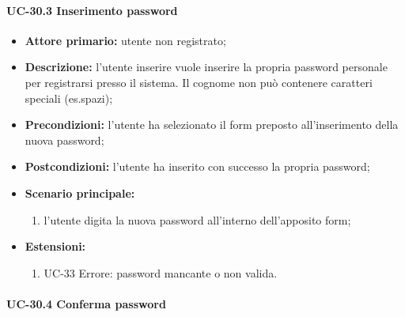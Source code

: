 \paragraph{UC-30.3 Inserimento password}

	\begin{itemize}
		\item \textbf{Attore primario:} utente non registrato;

		\item \textbf{Descrizione:} l'utente inserire vuole inserire la propria password personale per registrarsi presso il sistema. Il cognome non può contenere caratteri speciali (es.spazi);

		\item \textbf{Precondizioni:} l'utente ha selezionato il form preposto all'inserimento della nuova password;

		\item \textbf{Postcondizioni:} l'utente ha inserito con successo la propria password;

		\item \textbf{Scenario principale:}
			\begin{enumerate}
		  		\item l'utente digita la nuova password all'interno dell'apposito form;
	  		\end{enumerate}
		\item \textbf{Estensioni:}
	  		\begin{enumerate}
		  		\item UC-33 Errore: password mancante o non valida.
	  		\end{enumerate}
	\end{itemize}

\paragraph{UC-30.4 Conferma password}

